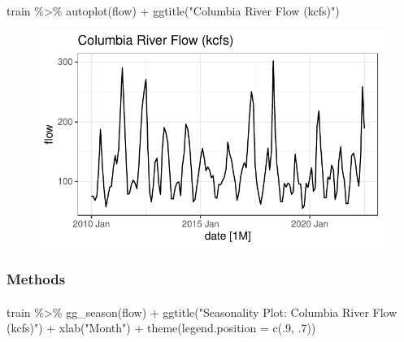 \documentclass[
  letterpaper,
  DIV=11,
  numbers=noendperiod]{scrartcl}
\let\oldparagraph\paragraph
\renewcommand{\paragraph}[1]{\oldparagraph{#1}\mbox{}}
\newenvironment{Shaded}{\begin{snugshade}}{\end{snugshade}}
\newcommand{\AttributeTok}[1]{\textcolor[rgb]{0.40,0.45,0.13}{#1}}
\newcommand{\DecValTok}[1]{\textcolor[rgb]{0.68,0.00,0.00}{#1}}
\newcommand{\FunctionTok}[1]{\textcolor[rgb]{0.28,0.35,0.67}{#1}}
\newcommand{\NormalTok}[1]{\textcolor[rgb]{0.00,0.23,0.31}{#1}}
\newcommand{\SpecialCharTok}[1]{\textcolor[rgb]{0.37,0.37,0.37}{#1}}
\newcommand{\StringTok}[1]{\textcolor[rgb]{0.13,0.47,0.30}{#1}}
\begin{document}
\hypertarget{section}{%
\paragraph{}\label{section}}

\begin{Shaded}
\begin{Highlighting}[]
\NormalTok{train }\SpecialCharTok{\%\textgreater{}\%} 
    \FunctionTok{autoplot}\NormalTok{(flow) }\SpecialCharTok{+}
    \FunctionTok{ggtitle}\NormalTok{(}\StringTok{"Columbia River Flow (kcfs)"}\NormalTok{)}
\end{Highlighting}
\end{Shaded}

\begin{figure}[H]

{\centering \includegraphics{Paper_files/figure-pdf/unnamed-chunk-1-1.pdf}

}

\end{figure}

\hypertarget{methods}{%
\subsubsection{Methods}\label{methods}}

\hypertarget{section-1}{%
\paragraph{}\label{section-1}}

\begin{Shaded}
\begin{Highlighting}[]
\NormalTok{train }\SpecialCharTok{\%\textgreater{}\%} 
  \FunctionTok{gg\_season}\NormalTok{(flow) }\SpecialCharTok{+}
  \FunctionTok{ggtitle}\NormalTok{(}\StringTok{"Seasonality Plot: Columbia River Flow (kcfs)"}\NormalTok{) }\SpecialCharTok{+}
  \FunctionTok{xlab}\NormalTok{(}\StringTok{"Month"}\NormalTok{) }\SpecialCharTok{+}
  \FunctionTok{theme}\NormalTok{(}\AttributeTok{legend.position =} \FunctionTok{c}\NormalTok{(.}\DecValTok{9}\NormalTok{, .}\DecValTok{7}\NormalTok{))}
\end{Highlighting}
\end{Shaded}
\end{document}
